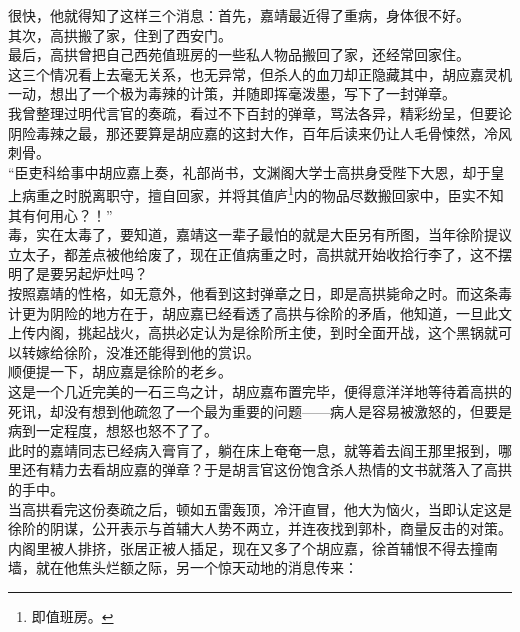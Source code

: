 \begin{multicols}{\theparacolNo}
很快，他就得知了这样三个消息：首先，嘉靖最近得了重病，身体很不好。\\

其次，高拱搬了家，住到了西安门。\\

最后，高拱曾把自己西苑值班房的一些私人物品搬回了家，还经常回家住。\\

这三个情况看上去毫无关系，也无异常，但杀人的血刀却正隐藏其中，胡应嘉灵机一动，想出了一个极为毒辣的计策，并随即挥毫泼墨，写下了一封弹章。\\

我曾整理过明代言官的奏疏，看过不下百封的弹章，骂法各异，精彩纷呈，但要论阴险毒辣之最，那还要算是胡应嘉的这封大作，百年后读来仍让人毛骨悚然，冷风刺骨。\\

“臣吏科给事中胡应嘉上奏，礼部尚书，文渊阁大学士高拱身受陛下大恩，却于皇上病重之时脱离职守，擅自回家，并将其值庐\footnote{即值班房。}内的物品尽数搬回家中，臣实不知其有何用心？！”\\

毒，实在太毒了，要知道，嘉靖这一辈子最怕的就是大臣另有所图，当年徐阶提议立太子，都差点被他给废了，现在正值病重之时，高拱就开始收拾行李了，这不摆明了是要另起炉灶吗？\\

按照嘉靖的性格，如无意外，他看到这封弹章之日，即是高拱毙命之时。而这条毒计更为阴险的地方在于，胡应嘉已经看透了高拱与徐阶的矛盾，他知道，一旦此文上传内阁，挑起战火，高拱必定认为是徐阶所主使，到时全面开战，这个黑锅就可以转嫁给徐阶，没准还能得到他的赏识。\\

顺便提一下，胡应嘉是徐阶的老乡。\\

这是一个几近完美的一石三鸟之计，胡应嘉布置完毕，便得意洋洋地等待着高拱的死讯，却没有想到他疏忽了一个最为重要的问题——病人是容易被激怒的，但要是病到一定程度，想怒也怒不了了。\\

此时的嘉靖同志已经病入膏肓了，躺在床上奄奄一息，就等着去阎王那里报到，哪里还有精力去看胡应嘉的弹章？于是胡言官这份饱含杀人热情的文书就落入了高拱的手中。\\

当高拱看完这份奏疏之后，顿如五雷轰顶，冷汗直冒，他大为恼火，当即认定这是徐阶的阴谋，公开表示与首辅大人势不两立，并连夜找到郭朴，商量反击的对策。\\

内阁里被人排挤，张居正被人插足，现在又多了个胡应嘉，徐首辅恨不得去撞南墙，就在他焦头烂额之际，另一个惊天动地的消息传来：\\


\end{multicols}

